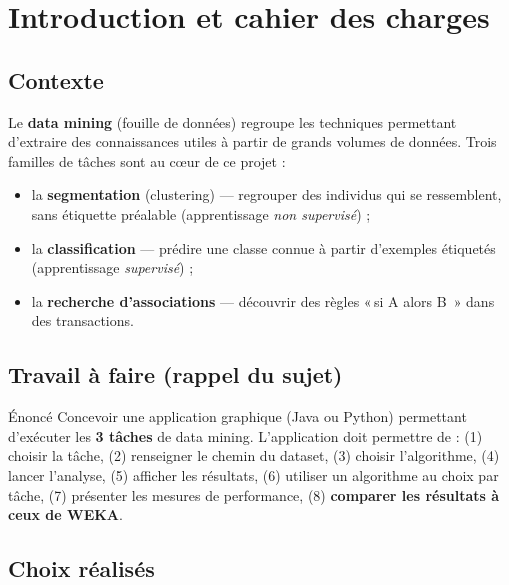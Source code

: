 \documentclass[11pt,a4paper]{article}
\providecommand{\og}{«\,}
\providecommand{\fg}{\,»}
\begin{document}
\tableofcontents
\newpage

\section{Introduction et cahier des charges}

\subsection{Contexte}

Le \textbf{data mining} (fouille de données) regroupe les techniques permettant
d'extraire des connaissances utiles à partir de grands volumes de données. Trois
familles de tâches sont au cœur de ce projet :

\begin{itemize}[leftmargin=*]
  \item la \textbf{segmentation} (clustering) --- regrouper des individus qui se
        ressemblent, sans étiquette préalable (apprentissage \emph{non supervisé}) ;
  \item la \textbf{classification} --- prédire une classe connue à partir
        d'exemples étiquetés (apprentissage \emph{supervisé}) ;
  \item la \textbf{recherche d'associations} --- découvrir des règles
        \og si A alors B \fg{} dans des transactions.
\end{itemize}

\subsection{Travail à faire (rappel du sujet)}

\begin{regle}{Énoncé}
Concevoir une application graphique (Java ou Python) permettant d'exécuter les
\textbf{3 tâches} de data mining. L'application doit permettre de : (1) choisir la
tâche, (2) renseigner le chemin du dataset, (3) choisir l'algorithme, (4) lancer
l'analyse, (5) afficher les résultats, (6) utiliser un algorithme au choix par
tâche, (7) présenter les mesures de performance, (8) \textbf{comparer les
résultats à ceux de WEKA}.
\end{regle}

\subsection{Choix réalisés}
\end{document}
